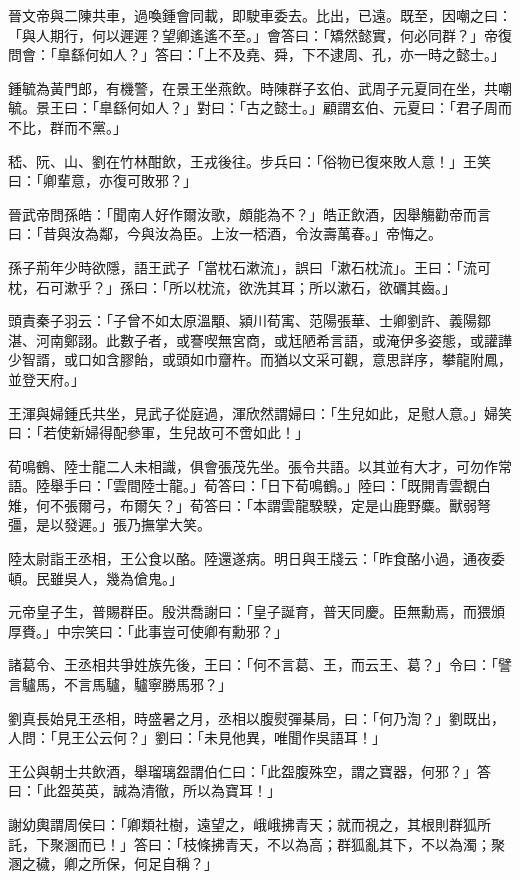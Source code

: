 晉文帝與二陳共車，過喚鍾會同載，即駛車委去。比出，已遠。既至，因嘲之曰：「與人期行，何以遲遲？望卿遙遙不至。」會答曰：「矯然懿實，何必同群？」帝復問會：「臯繇何如人？」答曰：「上不及堯、舜，下不逮周、孔，亦一時之懿士。」

鍾毓為黃門郎，有機警，在景王坐燕飲。時陳群子玄伯、武周子元夏同在坐，共嘲毓。景王曰：「臯繇何如人？」對曰：「古之懿士。」顧謂玄伯、元夏曰：「君子周而不比，群而不黨。」

嵇、阮、山、劉在竹林酣飲，王戎後往。步兵曰：「俗物已復來敗人意！」王笑曰：「卿輩意，亦復可敗邪？」

晉武帝問孫皓：「聞南人好作爾汝歌，頗能為不？」皓正飲酒，因舉觴勸帝而言曰：「昔與汝為鄰，今與汝為臣。上汝一桮酒，令汝壽萬春。」帝悔之。

孫子荊年少時欲隱，語王武子「當枕石漱流」，誤曰「漱石枕流」。王曰：「流可枕，石可漱乎？」孫曰：「所以枕流，欲洗其耳；所以漱石，欲礪其齒。」

頭責秦子羽云：「子曾不如太原溫顒、潁川荀㝢、范陽張華、士卿劉許、義陽鄒湛、河南鄭詡。此數子者，或謇喫無宮商，或尪陋希言語，或淹伊多姿態，或讙譁少智諝，或口如含膠飴，或頭如巾齏杵。而猶以文采可觀，意思詳序，攀龍附鳳，並登天府。」

王渾與婦鍾氏共坐，見武子從庭過，渾欣然謂婦曰：「生兒如此，足慰人意。」婦笑曰：「若使新婦得配參軍，生兒故可不啻如此！」

荀鳴鶴、陸士龍二人未相識，俱會張茂先坐。張令共語。以其並有大才，可勿作常語。陸舉手曰：「雲間陸士龍。」荀答曰：「日下荀鳴鶴。」陸曰：「既開青雲覩白雉，何不張爾弓，布爾矢？」荀答曰：「本謂雲龍騤騤，定是山鹿野麋。獸弱弩彊，是以發遲。」張乃撫掌大笑。

陸太尉詣王丞相，王公食以酪。陸還遂病。明日與王牋云：「昨食酪小過，通夜委頓。民雖吳人，幾為傖鬼。」

元帝皇子生，普賜群臣。殷洪喬謝曰：「皇子誕育，普天同慶。臣無勳焉，而猥頒厚賚。」中宗笑曰：「此事豈可使卿有勳邪？」

諸葛令、王丞相共爭姓族先後，王曰：「何不言葛、王，而云王、葛？」令曰：「譬言驢馬，不言馬驢，驢寧勝馬邪？」

劉真長始見王丞相，時盛暑之月，丞相以腹熨彈棊局，曰：「何乃渹？」劉既出，人問：「見王公云何？」劉曰：「未見他異，唯聞作吳語耳！」

王公與朝士共飲酒，舉瑠璃盌謂伯仁曰：「此盌腹殊空，謂之寶器，何邪？」答曰：「此盌英英，誠為清徹，所以為寶耳！」

謝幼輿謂周侯曰：「卿類社樹，遠望之，峨峨拂青天；就而視之，其根則群狐所託，下聚溷而已！」答曰：「枝條拂青天，不以為高；群狐亂其下，不以為濁；聚溷之穢，卿之所保，何足自稱？」


